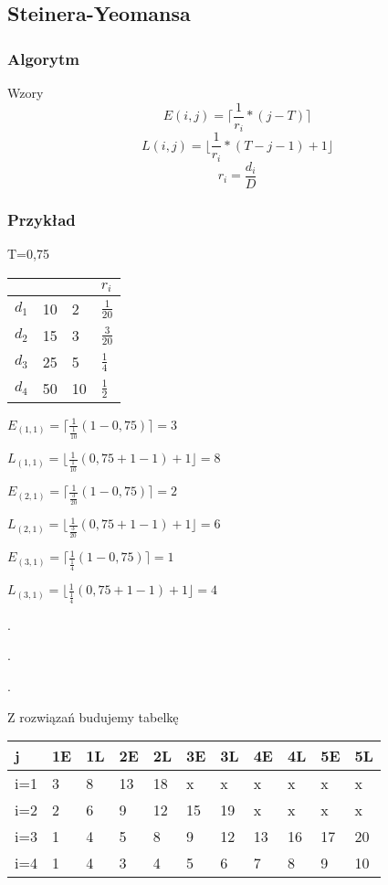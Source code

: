 \documentclass[12pt,a4paper]{article}
\begin{document}
\subsection{Steinera-Yeomansa}
\subsubsection{Algorytm}
Wzory
\begin{equation}
E(i,j)=\lceil \frac{1}{r_i} * (j-T)\rceil
\end{equation}
\begin{equation}
L(i,j)=\lfloor \frac{1}{r_i} * (T-j-1)+1\rfloor
\end{equation}
\begin{equation}
r_i = \frac{d_i}{D}
\end{equation}
\subsubsection{Przykład}
T=0,75
\begin{center}
    \begin{tabular}{ | l  |l |l|l|}
    \hline
		   &   &  &$r_i$ \\ \hline
    $d_1$  & 10&2& $\frac{1}{20}$\\ \hline
    $d_2$  & 15&3& $\frac{3}{20}$\\ \hline
    $d_3$  & 25&5& $\frac{1}{4}$\\ \hline
    $d_4$  & 50&10& $\frac{1}{2}$\\ \hline
 
    
    \end{tabular}
\end{center}


$E_{(1,1)} = \lceil \frac{1}{\frac{1}{10}}(1-0,75)\rceil = 3$

$L_{(1,1)} = \lfloor \frac{1}{\frac{1}{10}}(0,75+1-1)+1\rfloor = 8$

$E_{(2,1)} = \lceil \frac{1}{\frac{3}{20}}(1-0,75)\rceil = 2$

$L_{(2,1)} = \lfloor \frac{1}{\frac{3}{20}}(0,75+1-1)+1\rfloor = 6$

$E_{(3,1)} = \lceil \frac{1}{\frac{1}{4}}(1-0,75)\rceil = 1$

$L_{(3,1)} = \lfloor \frac{1}{\frac{1}{4}}(0,75+1-1)+1\rfloor = 4$

.

.

.

 Z rozwiązań budujemy tabelkę

\begin{center}
    \begin{tabular}{ |l|l|l|l|l|l|l|l|l|l|l|}
    \hline
		  j &1E&1L&2E&2L&3E&3L&4E&4L&5E&5L\\ \hline
		  i=1&3&8&13&18&x&x&x&x&x&x\\ \hline
		  i=2&2&6&9&12&15&19&x&x&x&x\\ \hline
		  i=3&1&4&5&8&9&12&13&16&17&20\\ \hline		
  		  i=4&1&4&3&4&5&6&7&8&9&10\\ \hline  
    \end{tabular}
\end{center}
\end{document}
